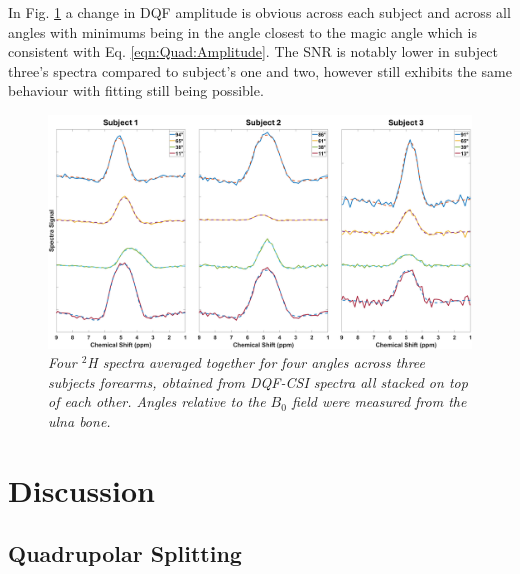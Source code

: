 In Fig. \ref{fig:Quad:DQF_CSI_Angle} a change in \ac{DQF} amplitude is obvious across each subject and across all angles with minimums being in the angle closest to the magic angle which is consistent with Eq. \ref{eqn:Quad:Amplitude}. The \ac{SNR} is notably lower in subject three's spectra compared to subject's one and two, however still exhibits the same behaviour with fitting still being possible.

\begin{figure}
    \centering
    \includegraphics[width=1\textwidth]{Figures/Quad/DQF_CSI_Angle.png}
    \caption{\textit{Four $^2$H spectra averaged together for four angles across three subjects forearms, obtained from \ac{DQF}-\ac{CSI} spectra all stacked on top of each other. Angles relative to the $B_0$ field were measured from the ulna bone.}}
    \label{fig:Quad:DQF_CSI_Angle}
\end{figure}

\section{Discussion}

\subsection{Quadrupolar Splitting}

